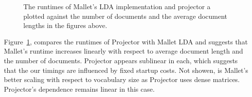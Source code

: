 \begin{figure}
\begin{center}

\end{center}
\caption{The runtimes of Mallet's LDA implementation and projector a plotted against
the number of documents and the average document lengths in the figures above. }
\label{fig:time-proj-mallet}
\end{figure}

Figure~\ref{fig:time-proj-mallet}, compares the runtimes of Projector with Mallet
LDA and suggests that Mallet's runtime increases linearly with respect
to average document length and the number of documents.  Projector appears sublinear
in each, which suggests that the our timings are influenced by fixed
startup costs.  Not showen, is Mallet's better scaling with respect
to vocabulary size as Projector uses dense matrices.  Projector's dependence
remains linear in this case. 
